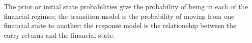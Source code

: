 \documentclass[12pt, a4paper, oneside]{article} %
\begin{document}

The prior or initial state probabilities give the probability of being in each of the financial regimes; the transition model is the probability of moving from one financial state to another; the response model is the relationship between the carry returns and the financial state.  
\end{document}
